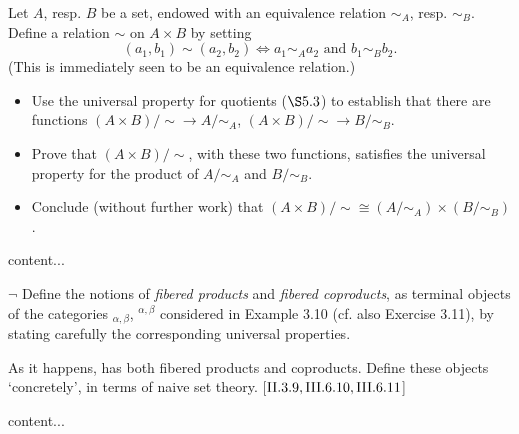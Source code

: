 \begin{exercise}
	Let \(A\), resp. \(B\) be a set, endowed with an equivalence relation \(\sim_A\), resp. \(\sim_B\). Define a relation \(\sim\) on \(A \times B\) by setting
	\begin{equation*}
		(a_1, b_1) \sim (a_2, b_2) \iff a_1 \sim_A a_2 \text{ and } b_1 \sim_B b_2.
	\end{equation*}
	(This is immediately seen to be an equivalence relation.)
	\begin{itemize}
		\item Use the universal property for quotients (\(\S 5.3\)) to establish that there are functions
		\((A \times B)/{\sim} \to A/{\sim}_A\), \((A \times B)/{\sim} \to B/{\sim}_B\).
		\item Prove that \((A \times B)/{\sim}\), with these two functions, satisfies the universal property
		for the product of \(A/{\sim}_A\) and \(B/{\sim}_B\).
		\item Conclude (without further work) that \((A \times B)/{\sim} \cong (A/{\sim}_A) \times (B/{\sim}_B)\).
	\end{itemize}
\end{exercise}
\begin{solution}
	content...
\end{solution}

\begin{exercise}
	\(\neg\) Define the notions of \textit{fibered products} and \textit{fibered coproducts}, as terminal objects of the categories \(_{\alpha,\beta}\), \(^{\alpha,\beta}\) considered in Example 3.10 (cf. also Exercise 3.11), by stating carefully the corresponding universal properties.
	
	As it happens,  has both fibered products and coproducts. Define these objects ‘concretely’, in terms of naive set theory. [\(\RNo{2}.3.9, \RNo{3}.6.10, \RNo{3}.6.11\)]
\end{exercise}
\begin{solution}
	content...
\end{solution}